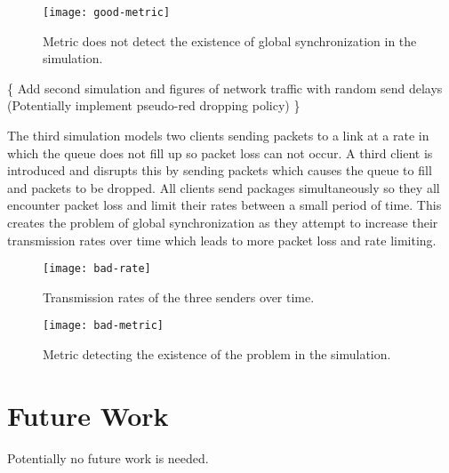 \documentclass{article}
\begin{document}
	\begin{figure}[H]
		\centering
		\texttt{[image: good-metric]}
		\caption{Metric does not detect the existence of global synchronization in the simulation.}
	\end{figure}
	
																			\{ Add second simulation and figures of network traffic with random send delays (Potentially implement pseudo-red dropping policy) \}\newline
																			
	The third simulation models two clients sending packets to a link at a rate in which the queue does not fill up so packet loss can not occur. A third client is introduced and disrupts this by sending packets which causes the queue to fill and packets to be dropped. All clients send packages simultaneously so they all encounter packet loss and limit their rates between a small period of time. This creates the problem of global synchronization as they attempt to increase their transmission rates over time which leads to more packet loss and rate limiting.\newline
	\begin{figure}[H]
		\centering
		\texttt{[image: bad-rate]}
		\caption{Transmission rates of the three senders over time.}
	\end{figure}

	\begin{figure}[H]
		\centering
		\texttt{[image: bad-metric]}
		\caption{Metric detecting the existence of the problem in the simulation.}
	\end{figure}

\section{Future Work}
Potentially no future work is needed.



\end{document}
